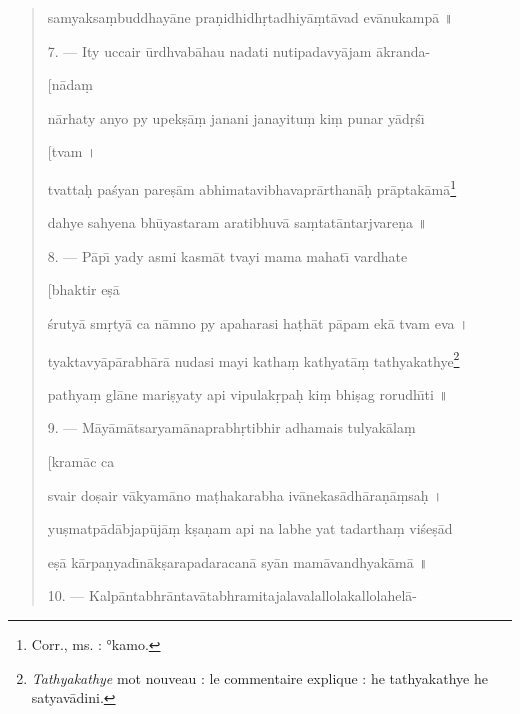 \documentclass[a4paper, 11pt, oneside, french, landscape, twocolumn]{article}
\begin{document}
\begin{quotation}
samyaksa\d{m}buddhay\={a}ne pra\d{n}idhidh\d{r}tadhiy\={a}\d{m}t\={a}vad ev\={a}nukamp\={a} \texthindi{॥}

\bigskip

7. --- Ity uccair \={u}rdhvab\={a}hau nadati nutipadavy\={a}jam \={a}kranda-

\hspace*{55mm}[n\={a}da\d{m}

n\={a}rhaty anyo py upek\d{s}\={a}\d{m} janani janayitu\d{m} ki\d{m} punar y\={a}d\d{r}\'{s}\={\i}

\hspace*{55mm}[tvam \texthindi{।}

tvatta\d{h} pa\'{s}yan pare\d{s}\={a}m abhimatavibhavapr\={a}rthan\={a}\d{h} pr\={a}ptak\={a}m\={a}\footnote{Corr., ms. : °kamo.}

dahye sahyena bh\={u}yastaram aratibhuv\={a} sa\d{m}tat\={a}ntarjvare\d{n}a \texthindi{॥}

\bigskip

8. --- P\={a}p\={\i} yady asmi kasm\={a}t tvayi mama mahat\={\i} vardhate

\hspace*{55mm}[bhaktir e\d{s}\={a}

\'{s}ruty\={a} sm\d{r}ty\={a} ca n\={a}mno py apaharasi ha\d{t}h\={a}t p\={a}pam ek\={a} tvam eva \texthindi{।}

tyaktavy\={a}p\={a}rabh\={a}r\={a} nudasi mayi katha\d{m} kathyat\={a}\d{m} tathyakathye\footnote{\emph{Tathyakathye} mot nouveau : le commentaire explique : he tathyakathye he satyav\={a}dini.}

pathya\d{m} gl\={a}ne mari\d{s}yaty api vipulak\d{r}pa\d{h} ki\d{m} bhi\d{s}ag rorudh\={\i}ti \texthindi{॥}

\bigskip

9. --- M\={a}y\={a}m\={a}tsaryam\={a}naprabh\d{r}tibhir adhamais tulyak\={a}la\d{m}

\hspace*{55mm}[kram\={a}c ca

svair do\d{s}air v\={a}kyam\={a}no ma\d{t}hakarabha iv\={a}nekas\={a}dh\={a}ra\d{n}\={a}\d{m}sa\d{h} \texthindi{।}

yu\d{s}matp\={a}d\={a}bjap\={u}j\={a}\d{m} k\d{s}a\d{n}am api na labhe yat tadartha\d{m} vi\'{s}e\d{s}\={a}d

e\d{s}\={a} k\={a}rpa\d{n}yad\={\i}n\={a}k\d{s}arapadaracan\={a} sy\={a}n mam\={a}vandhyak\={a}m\={a} \texthindi{॥}

\bigskip

10. --- Kalp\={a}ntabhr\={a}ntav\={a}tabhramitajalavalallolakallolahel\={a}-


\end{quotation}
\end{document}
